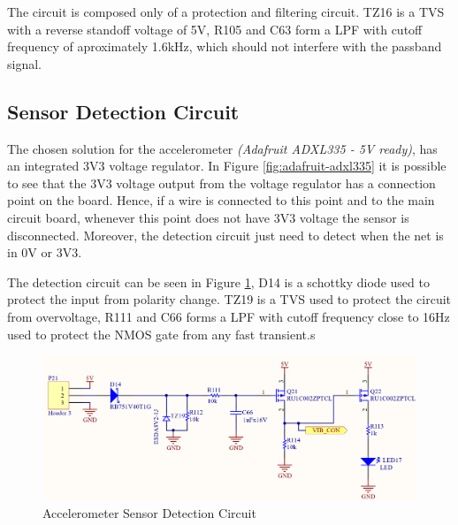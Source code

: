 	The circuit is composed only of a protection and filtering circuit. TZ16 is a TVS with a reverse standoff voltage of 5V, R105 and C63 form a LPF with cutoff frequency of aproximately 1.6kHz, which should not interfere with the passband signal.

\subsection{Sensor Detection Circuit}\label{ssec:accelerometer-sensor-detection-circuit}

	The chosen solution for the accelerometer \textit{(Adafruit ADXL335 - 5V ready)}, has an integrated 3V3 voltage regulator. In Figure \ref{fig:adafruit-adxl335} it is possible to see that the 3V3 voltage output from the voltage regulator has a connection point on the board. Hence, if a wire is connected to this point and to the main circuit board, whenever this point does not have 3V3 voltage the sensor is disconnected. Moreover, the detection circuit just need to detect when the net is in 0V or 3V3.
	\par
	The detection circuit can be seen in Figure \ref{fig:accelerometer-sensor-detection-circuit}, D14 is a schottky diode used to protect the input from polarity change. TZ19 is a TVS used to protect the circuit from overvoltage, R111 and C66 forms a LPF with cutoff frequency close to 16Hz used to protect the NMOS gate from any fast transient.s

	\begin{figure}[htbp]
		\centering
		\includegraphics[width=1\textwidth]{figuras/fig-accelerometer-sensor-detection-circuit.png}
		\caption{Accelerometer Sensor Detection Circuit}
		\label{fig:accelerometer-sensor-detection-circuit}
	\end{figure}